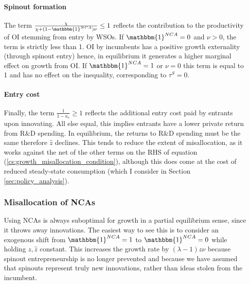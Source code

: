 \documentclass[11pt,english]{article}
\begin{document}
\paragraph{Spinout formation}

The term $\frac{\chi}{\chi + (1-\mathbbm{1}^{NCA})\nu} \le 1$ reflects the contribution to the productivity of OI stemming from entry by WSOs. If $\mathbbm{1}^{NCA} = 0$ and $\nu > 0$, the term is strictly less than 1. OI by incumbents has a positive growth externality (through spinout entry) hence, in equilibrium it generates a higher marginal effect on growth from OI. If $\mathbbm{1}^{NCA} = 1$ or $\nu = 0$ this term is equal to 1 and has no effect on the inequality, corresponding to $\tau^S = 0$.


\paragraph{Entry cost}

Finally, the term $\frac{1}{1-\kappa_e} \ge 1$ reflects the additional entry cost paid by entrants upon innovating. All else equal, this implies entrants have a lower private return from R\&D spending. In equilibrium, the returns to R\&D spending must be the same therefore $\hat{z}$ declines. This tends to reduce the extent of misallocation, as it works against the net of the other terms on the RHS of equation (\ref{cs:growth_misallocation_condition}), although this does come at the cost of reduced steady-state consumption (which I consider in Section \ref{sec:policy_analysis}).


\subsubsection{Misallocation of NCAs}\label{model:efficiency:misallocationNCAs}

Using NCAs is always suboptimal for growth in a partial equilibrium sense, since it throws away innovations. The easiest way to see this is to consider an exogenous shift from $\mathbbm{1}^{NCA} = 1$ to $\mathbbm{1}^{NCA} = 0$ while holding $z,\hat{z}$ constant. This increases the growth rate by $(\lambda -1) z \nu$ because spinout entrepreneurship is no longer prevented and because we have assumed that spinouts represent truly new innovations, rather than ideas stolen from the incumbent.
\end{document}
